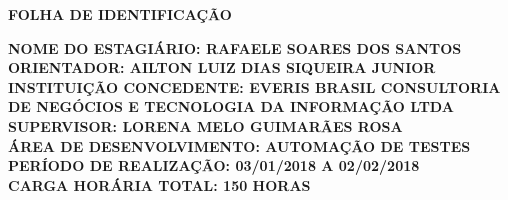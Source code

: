 \newpage
\thispagestyle{empty}

\begin{center}
\textbf{FOLHA DE IDENTIFICAÇÃO}
\vspace*{5 cm}
\end{center}

\begin{flushleft}
\textbf{NOME DO ESTAGIÁRIO: RAFAELE SOARES DOS SANTOS\\
ORIENTADOR: AILTON LUIZ DIAS SIQUEIRA JUNIOR\\
INSTITUIÇÃO CONCEDENTE: EVERIS BRASIL CONSULTORIA DE NEGÓCIOS E TECNOLOGIA DA INFORMAÇÃO LTDA\\
SUPERVISOR: LORENA MELO GUIMARÃES ROSA\\
ÁREA DE DESENVOLVIMENTO: AUTOMAÇÃO DE TESTES\\
PERÍODO DE REALIZAÇÃO: 03/01/2018 A 02/02/2018\\
CARGA HORÁRIA TOTAL: 150 HORAS
}
\end{flushleft}
